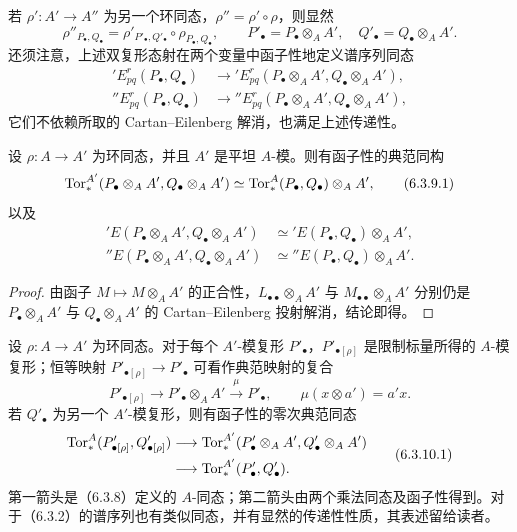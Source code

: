 若 $\rho':A'\to A''$ 为另一个环同态，$\rho''=\rho'\circ\rho$，则显然
\[
 \rho''_{P_\bullet,Q_\bullet}
 =\rho'_{P'_\bullet,Q'_\bullet}\circ\rho_{P_\bullet,Q_\bullet},
 \qquad P'_\bullet=P_\bullet\otimes_AA',\quad Q'_\bullet=Q_\bullet\otimes_AA'.
\]
还须注意，上述双复形态射在两个变量中函子性地定义谱序列同态
\begin{align*}
 {}'E^r_{pq}(P_\bullet,Q_\bullet)&\longrightarrow{}'E^r_{pq}(P_\bullet\otimes_AA',Q_\bullet\otimes_AA'),\\
 {}''E^r_{pq}(P_\bullet,Q_\bullet)&\longrightarrow{}''E^r_{pq}(P_\bullet\otimes_AA',Q_\bullet\otimes_AA'),
\end{align*}
它们不依赖所取的 Cartan--Eilenberg 解消，也满足上述传递性。

设 $\rho:A\to A'$ 为环同态，并且 $A'$ 是平坦 $A$-模。则有函子性的典范同构
\begin{equation}
 \operatorname{Tor}_*^{A'}(P_\bullet\otimes_AA',Q_\bullet\otimes_AA')
 \simeq\operatorname{Tor}_*^A(P_\bullet,Q_\bullet)\otimes_AA',\tag{6.3.9.1}
\end{equation}
以及
\begin{equation}
\begin{aligned}
 {}'E(P_\bullet\otimes_AA',Q_\bullet\otimes_AA')&\simeq{}'E(P_\bullet,Q_\bullet)\otimes_AA',\\
 {}''E(P_\bullet\otimes_AA',Q_\bullet\otimes_AA')&\simeq{}''E(P_\bullet,Q_\bullet)\otimes_AA'.
\end{aligned}\tag{6.3.9.2}
\end{equation}
\begin{proof}
由函子 $M\mapsto M\otimes_AA'$ 的正合性，$L_{\bullet\bullet}\otimes_AA'$ 与 $M_{\bullet\bullet}\otimes_AA'$ 分别仍是 $P_\bullet\otimes_AA'$ 与 $Q_\bullet\otimes_AA'$ 的 Cartan--Eilenberg 投射解消，结论即得。
\end{proof}

设 $\rho:A\to A'$ 为环同态。对于每个 $A'$-模复形 $P'_\bullet$，$P'_{\bullet[\rho]}$ 是限制标量所得的 $A$-模复形；恒等映射 $P'_{\bullet[\rho]}\to P'_\bullet$ 可看作典范映射的复合
\[
 P'_{\bullet[\rho]}\longrightarrow P'_\bullet\otimes_AA'
 \xrightarrow{\mu}P'_\bullet,
 \qquad\mu(x\otimes a')=a'x.
\]
若 $Q'_\bullet$ 为另一个 $A'$-模复形，则有函子性的零次典范同态
\begin{equation}
\begin{split}
 \operatorname{Tor}_*^A(P'_{\bullet[\rho]},Q'_{\bullet[\rho]})
 &\longrightarrow\operatorname{Tor}_*^{A'}(P'_\bullet\otimes_AA',Q'_\bullet\otimes_AA')\\
 &\longrightarrow\operatorname{Tor}_*^{A'}(P'_\bullet,Q'_\bullet).
\end{split}\tag{6.3.10.1}
\end{equation}
第一箭头是（6.3.8）定义的 $A$-同态；第二箭头由两个乘法同态及函子性得到。对于（6.3.2）的谱序列也有类似同态，并有显然的传递性性质，其表述留给读者。

